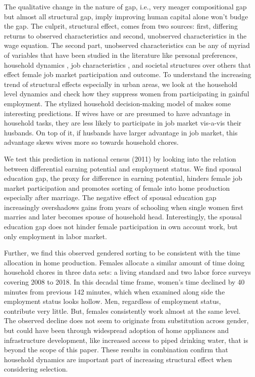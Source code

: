 The qualitative change in the nature of gap, i.e., very meager compositional gap but almost all structural gap, imply improving human capital alone won't budge the gap. The culprit, structural effect, comes from two sources: first, differing returns to observed characteristics and second, unobserved characteristics in the wage equation. The second part, unobserved characteristics can be any of myriad of variables that have been studied in the literature like  personal preferences\parencite{Wiswall2017, LeBarbanchon2020}, household dynamics \parencite{Bertrand2015, Goldin2017}, job characteristics \parencite{Card2015}, and societal structures \parencite{Givord2015, Lippmann2020, Goldin2006, Becker2019} over others that effect female job market participation and outcome. To understand the increasing trend of structural effects especially in urban areas, we look at the household level dynamics and check how they suppress women from participating in gainful employment. The stylized household decision-making model of \textcite{Cortes2020} makes some interesting predictions. If wives have or are presumed to have advantage in household tasks, they are less likely to participate in job market vis-a-vis their husbands. On top of it, if husbands have larger advantage in job market, this advantage skews wives more so towards household chores. \par

We test this prediction in national census (2011) by looking into the relation between differential earning potential and employment status. We find spousal education gap, the proxy for difference in earning potential, hinders female job market participation and promotes sorting of female into home production especially after marriage. The negative effect of spousal education gap increasingly overshadows gains from years of schooling when single women first marries and later becomes spouse of household head. Interestingly, the spousal education gap does not hinder female participation in own account work, but only employment in labor market.\par 

Further, we find this observed gendered sorting to be consistent with the time allocation in home production. Females allocate a similar amount of time doing household chores in three data sets:  a living standard and two labor force  surveys covering 2008 to 2018. In this decadal time frame, women's time declined by 40 minutes from previous 142 minutes, which when examined along side the employment status looks hollow. Men, regardless of employment status, contribute very little. But, females consistently work almost at the same level. The observed decline does not seem to originate from substitution across gender, but could have been through widespread adoption of home appliances and infrastructure development, like increased access to piped drinking water, that is beyond the scope of this paper. These results in combination confirm that household dynamics are important part of increasing structural effect when considering selection.\par

